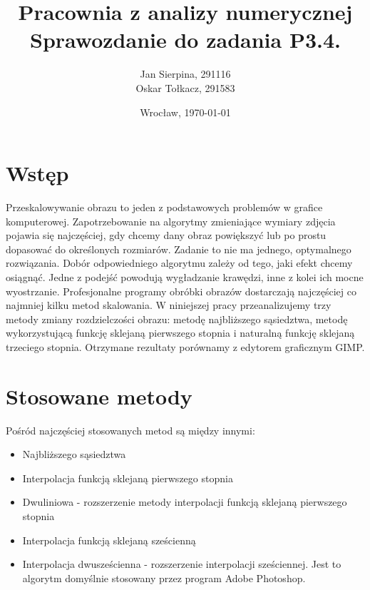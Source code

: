 \documentclass{mwart}
\title{Pracownia z analizy numerycznej \\
	\large Sprawozdanie do zadania P3.4.}
\author{Jan Sierpina, 291116 \\
	Oskar Tołkacz, 291583}
\date{Wrocław, \today}
\theoremstyle{definition}
\begin{document}
\maketitle

\tableofcontents


\section{Wstęp}
Przeskalowywanie obrazu to jeden z podstawowych problemów w grafice komputerowej. Zapotrzebowanie na algorytmy zmieniające wymiary zdjęcia pojawia się najczęściej, gdy chcemy dany obraz powiększyć lub po prostu dopasować do określonych rozmiarów. Zadanie to nie ma jednego, optymalnego rozwiązania. Dobór odpowiedniego algorytmu zależy od tego, jaki efekt chcemy osiągnąć. Jedne z podejść powodują
wygładzanie krawędzi, inne z kolei ich mocne wyostrzanie. Profesjonalne programy obróbki obrazów dostarczają najczęściej co najmniej kilku metod skalowania. W niniejszej pracy przeanalizujemy trzy metody zmiany rozdzielczości obrazu: metodę najbliższego sąsiedztwa, metodę wykorzystującą funkcję sklejaną pierwszego stopnia i naturalną funkcję sklejaną trzeciego stopnia. Otrzymane rezultaty porównamy z edytorem graficznym GIMP.

\section{Stosowane metody}
Pośród najczęściej stosowanych metod są między innymi:
\begin{itemize}
\item Najbliższego sąsiedztwa
\item Interpolacja funkcją sklejaną pierwszego stopnia
\item Dwuliniowa - rozszerzenie metody interpolacji funkcją sklejaną pierwszego stopnia
\item Interpolacja funkcją sklejaną sześcienną
\item Interpolacja dwusześcienna - rozszerzenie interpolacji sześciennej. Jest to algorytm domyślnie stosowany przez program Adobe Photoshop.
\end{itemize}
\end{document}

